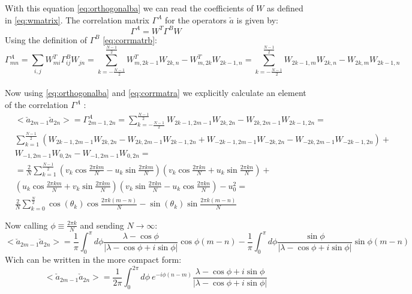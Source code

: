 \documentclass[12pt,a4paper]{book}
\theoremstyle{definition}
\begin{document}
With this equation \ref{eq:orthogonalba} we can read the coefficients of $W$ as defined in \ref{eq:wmatrix}.
\newline
The correlation matrix $\Gamma^A$ for the operators $\check{a}$ is given by:
\begin{equation}
	\Gamma^A=W^T\Gamma^BW
\end{equation}
Using the definition of $\Gamma^B$ \ref{eq:corrmatrb}:
\begin{equation}\label{eq:corrmatra}
	\Gamma^A_{mn}= \sum_{i,j}  W^T_{mi} \Gamma^B_{ij} W_{jn}=\sum_{k=-\frac{N-1}{2}}^{\frac{N-1}{2}} W^T_{m , 2k-1}W_{2k,n}-W^T_{m , 2k}W_{2k-1,n}=\sum_{k=-\frac{N-1}{2}}^{\frac{N-1}{2}}  W_{2k-1,m}W_{2k,n}-W_{2k , m}W_{2k-1,n}
\end{equation}\\
Now using \ref{eq:orthogonalba} and \ref{eq:corrmatra} we explicitly calculate an element of the correlation $\Gamma^A$ :
\begin{equation}\begin{aligned}\label{eq:finiten}
		&<\check{a}_{2m-1}\check{a}_{2n}>=\Gamma^A_{2m-1,2n}=\sum_{k=-\frac{N-1}{2}}^{\frac{N-1}{2}}  W_{2k-1,2m-1}W_{2k,2n}-W_{2k , 2m-1}W_{2k-1,2n}=\\
		&\sum_{k=1}^{\frac{N-1}{2}}\left(  W_{2k-1,2m-1}W_{2k,2n}-W_{2k , 2m-1}W_{2k-1,2n}+W_{-2k-1,2m-1}W_{-2k,2n}-W_{-2k , 2m-1}W_{-2k-1,2n}\right)+ \\&W_{-1,2m-1}W_{0,2n}-W_{-1 , 2m-1}W_{0,2n}=\\
		&=\frac{2}{N}\sum_{k=1}^{\frac{N-1}{2}}\left(v_k \cos \frac{2 \pi k m}{N}-u_k\sin \frac{2 \pi k m}{N}\right)\left(v_k\cos \frac{2 \pi k n}{N}+u_k\sin \frac{2 \pi k n}{N}\right)+\\& \left(u_k \cos \frac{2 \pi k m}{N}+v_k\sin \frac{2 \pi k m}{N}\right)\left(v_k\sin \frac{2 \pi k n}{N}-u_k\cos \frac{2 \pi k n}{N}\right)-u_0^2= \\
		&\frac{2}{N}\sum_{k=0}^{\frac{N}{2}}\cos(\theta_k)\cos{\frac{2\pi k (m-n)}{N}}-\sin(\theta_k)\sin{\frac{2\pi k (m-n)}{N}}\\\\
	\end{aligned}	
\end{equation}
Now calling $\phi \equiv \frac{2\pi k}{N}$ and sending $N\rightarrow\infty$:
\begin{equation}
	<\check{a}_{2m-1}\check{a}_{2n}>=\frac{1}{\pi}\int_{0}^{\pi}d\phi    \frac{\lambda-\cos\phi}{|\lambda-\cos\phi+i\sin\phi|}\cos{\phi(m-n)}-\frac{1}{\pi}\int_{0}^{\pi}d\phi \frac{\sin\phi}{|\lambda-\cos\phi+i\sin\phi|}\sin{\phi(m-n)}
\end{equation}
Wich can be written in the more compact form:
\begin{equation}
	<\check{a}_{2m-1}\check{a}_{2n}>=\frac{1}{2\pi}\int_{0}^{2\pi}d\phi \  e^{-i \phi  (n-m)} \frac{\lambda-\cos\phi+i\sin\phi}{|\lambda-\cos\phi+i\sin\phi|}
\end{equation}



\end{document}
